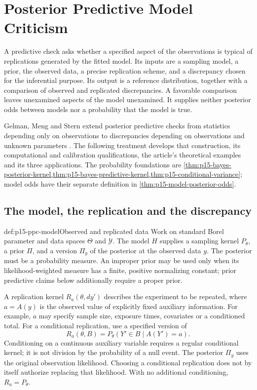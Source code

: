 \chapter{Posterior Predictive Model Criticism}
\label{sec:p15-posterior-predictive-model-criticism}

A predictive check asks whether a specified aspect of the observations is
typical of replications generated by the fitted model. Its inputs are a
sampling model, a prior, the observed data, a precise replication scheme,
and a discrepancy chosen for the inferential purpose. Its output is a
reference distribution, together with a comparison of observed and replicated
discrepancies. A favorable comparison leaves unexamined aspects of the model
unexamined. It supplies neither posterior odds between models nor a probability
that the model is true.

Gelman, Meng and Stern extend posterior predictive checks from statistics
depending only on observations to discrepancies depending on observations
and unknown parameters \cite[secs.~1--4]{GelmanMengStern1996Main}.
The following treatment develops that construction, its computational and
calibration qualifications, the article's theoretical examples and its three
applications. The probability foundations are
\cref{thm:p15-bayes-posterior-kernel,thm:p15-bayes-predictive-kernel,thm:p15-conditional-variance};
model odds have their separate definition in
\cref{thm:p15-model-posterior-odds}.

\section{The model, the replication and the discrepancy}
\label{sec:p15-ppc-construction}

\begin{hbdefinition}{def:p15-ppc-model}{Observed and replicated data}
Work on standard Borel parameter and data spaces \(\Theta\) and
\(\mathcal Y\). The model \(H\) supplies a sampling kernel \(P_\theta\),
a prior \(\Pi\), and a version \(\Pi_y\) of the posterior at the observed
data \(y\). The posterior must be a probability measure. An improper prior
may be used only when its likelihood-weighted measure has a finite, positive
normalizing constant; prior predictive claims below additionally require
a proper prior.

A replication kernel \(R_a(\theta,dy')\) describes the experiment to be
repeated, where \(a=A(y)\) is the observed value of explicitly fixed auxiliary
information. For example, \(a\) may specify sample size, exposure times,
covariates or a conditioned total. For a conditional replication, use a
specified version of
\[
 R_a(\theta,B)=P_\theta(Y'\in B\mid A(Y')=a).
\]
Conditioning on a continuous auxiliary variable requires a regular conditional
kernel; it is not division by the probability of a null event. The posterior
\(\Pi_y\) uses the original observation likelihood. Choosing a conditional
replication does not by itself authorize replacing that likelihood.
With no additional conditioning, \(R_a=P_\theta\).
\end{hbdefinition}

